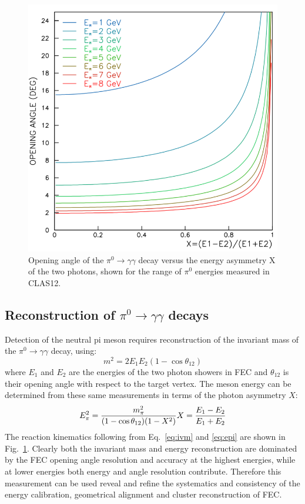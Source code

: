 \begin{figure}[t]
\centering
\includegraphics[width=0.7\columnwidth,keepaspectratio]{img/opa.png}
\caption[]{Opening angle of the $\pi^0 \rightarrow \gamma \gamma$ decay versus the energy asymmetry X of the two photons, shown for the range of $\pi^0$ energies measured in CLAS12. }
\label{fig:opa}
\end{figure}

\subsection{Reconstruction of $\pi^0\rightarrow \gamma \gamma$ decays}

Detection of the neutral pi meson requires reconstruction of the invariant mass of the $\pi^0 \rightarrow \gamma \gamma$ decay, using:
\begin{equation}
m^2 = 2 E_1 E_2 (1-\cos \theta_{12})
\label{eq:ivm}
\end{equation}
 where $E_1$ and $E_2$ are the energies of the two photon showers in FEC and $\theta_{12}$ is their opening angle with respect to the target vertex.  The meson energy can be determined from these same measurements in terms of the photon asymmetry $X$:
\begin{equation}
E^2_{\pi} = \frac{m^2_{\pi}}{(1-\cos \theta_{12})(1-X^2)}  \\
X=\frac{E_1-E_2}{E_1+E_2}
\label{eq:epi}
\end{equation}
The reaction kinematics following from Eq.~\ref{eq:ivm} and \ref{eq:epi} are shown in Fig.~\ref{fig:opa}.  Clearly both the invariant mass and energy reconstruction are dominated by the FEC opening angle resolution and accuracy at the highest energies, while at lower energies both energy and angle resolution contribute.   Therefore this measurement can be used reveal and refine the systematics and consistency of the energy calibration, geometrical alignment and cluster reconstruction of FEC.


